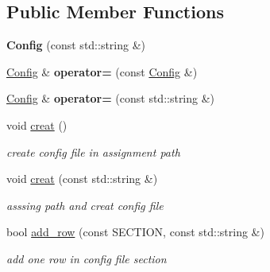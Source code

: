 \subsection*{Public Member Functions}
\begin{DoxyCompactItemize}
\item 
\mbox{\label{class_config_ad74e2a92db53fa68dadf2efd0d8b59be}} 
{\bfseries Config} (const std\+::string \&)
\item 
\mbox{\label{class_config_a7467670e36e879accebd5ede185724c9}} 
\mbox{\hyperlink{class_config}{Config}} \& {\bfseries operator=} (const \mbox{\hyperlink{class_config}{Config}} \&)
\item 
\mbox{\label{class_config_a6fb87004fcddb63a908a5e27f70dc014}} 
\mbox{\hyperlink{class_config}{Config}} \& {\bfseries operator=} (const std\+::string \&)
\item 
\mbox{\label{class_config_aef0ec22ee92ab7f39647cd22ec34e0e4}} 
void \mbox{\hyperlink{class_config_aef0ec22ee92ab7f39647cd22ec34e0e4}{creat}} ()
\begin{DoxyCompactList}\small\item\em create config file in assignment path \end{DoxyCompactList}\item 
\mbox{\label{class_config_aee780600cc3fb3ad239730e113379436}} 
void \mbox{\hyperlink{class_config_aee780600cc3fb3ad239730e113379436}{creat}} (const std\+::string \&)
\begin{DoxyCompactList}\small\item\em asssing path and creat config file \end{DoxyCompactList}\item 
\mbox{\label{class_config_a5e31b9666527f099f1a542d4ec668e40}} 
bool \mbox{\hyperlink{class_config_a5e31b9666527f099f1a542d4ec668e40}{add\+\_\+row}} (const S\+E\+C\+T\+I\+ON, const std\+::string \&)
\begin{DoxyCompactList}\small\item\em add one row in config file section \end{DoxyCompactList}\item 
\mbox{\label{class_config_a9db2df151d53943ec0c02358cdc6c8e0}} 

\end{DoxyCompactItemize}
